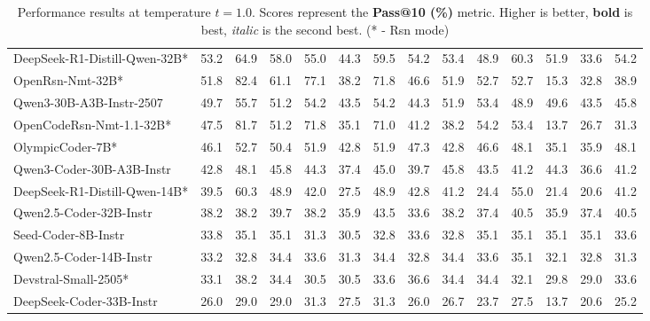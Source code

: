 \documentclass{llmxive}
\begin{document}
\begin{table}[hbt]
{\begin{tabular}{l *{13}{c}}
DeepSeek-R1-Distill-Qwen-32B* & 	53.2 &  64.9 &  58.0 &  55.0 &  44.3 &  59.5 &  54.2 &  53.4 &  48.9 &  60.3 &  51.9 &  33.6 &  54.2\\ 										
\rowcolor{gray!10}
OpenRsn-Nmt-32B* & 	51.8 &  82.4 &  61.1 &  77.1 &  38.2 &  71.8 &  46.6 &  51.9 &  52.7 &  52.7 &  15.3 &  32.8 &  38.9\\ 											
Qwen3-30B-A3B-Instr-2507&	49.7 &  55.7 &  51.2 &  54.2 &  43.5 &  54.2 &  44.3 &  51.9 &  53.4 &  48.9 &  49.6 &  43.5 &  45.8\\ 											
\rowcolor{gray!10}
OpenCodeRsn-Nmt-1.1-32B* & 	47.5 &  81.7 &  51.2 &  71.8 &  35.1 &  71.0 &  41.2 &  38.2 &  54.2 &  53.4 &  13.7 &  26.7 &  31.3\\ 											
OlympicCoder-7B* & 	46.1 &  52.7 &  50.4 &  51.9 &  42.8 &  51.9 &  47.3 &  42.8 &  46.6 &  48.1 &  35.1 &  35.9 &  48.1\\ 											
\rowcolor{gray!10}
Qwen3-Coder-30B-A3B-Instr & 42.8 &  48.1 &  45.8 &  44.3 &  37.4 &  45.0 &  39.7 &  45.8 &  43.5 &  41.2 &  44.3 &  36.6 &  41.2\\ 											
DeepSeek-R1-Distill-Qwen-14B* & 	39.5 &  60.3 &  48.9 &  42.0 &  27.5 &  48.9 &  42.8 &  41.2 &  24.4 &  55.0 &  21.4 &  20.6 &  41.2\\ 										
\rowcolor{gray!10}
Qwen2.5-Coder-32B-Instr & 38.2 &  38.2 &  39.7 &  38.2 &  35.9 &  43.5 &  33.6 &  38.2 &  37.4 &  40.5 &  35.9 &  37.4 &  40.5\\ 											
Seed-Coder-8B-Instr & 33.8 &  35.1 &  35.1 &  31.3 &  30.5 &  32.8 &  33.6 &  32.8 &  35.1 &  35.1 &  35.1 &  35.1 &  33.6\\ 											
\rowcolor{gray!10}
Qwen2.5-Coder-14B-Instr & 33.2 &  32.8 &  34.4 &  33.6 &  31.3 &  34.4 &  32.8 &  34.4 &  33.6 &  35.1 &  32.1 &  32.8 &  31.3\\ 											
Devstral-Small-2505* &	33.1 &  38.2 &  34.4 &  30.5 &  30.5 &  33.6 &  36.6 &  34.4 &  34.4 &  32.1 &  29.8 &  29.0 &  33.6\\ 											
\rowcolor{gray!10}
DeepSeek-Coder-33B-Instr & 26.0 &  29.0 &  29.0 &  31.3 &  27.5 &  31.3 &  26.0 &  26.7 &  23.7 &  27.5 &  13.7 &  20.6 &  25.2\\ 											

\bottomrule
\end{tabular}
}
\caption{Performance results at temperature $t=1.0$. Scores represent the \textbf{Pass@10 (\%)} metric. Higher is better, \textbf{bold} is best, \textit{italic} is the second best. (* - Rsn mode)}
\label{tab_exps_feb25_pass10_t1.0}
\end{table}
\end{document}
